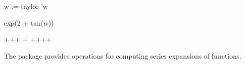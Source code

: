 {{{{{{{{{{{{{{\begin{xtc}
\begin{spadsrc}
w := taylor 'w 
\end{spadsrc}
\begin{TeXOutput}
\begin{fricasmath}{11}
%
\end{fricasmath}
\end{TeXOutput}
\end{xtc}
\begin{xtc}
\begin{xtccomment}
\end{xtccomment}
\begin{spadsrc}
exp(2 + tan(w)) 
\end{spadsrc}
\begin{TeXOutput}
\begin{fricasmath}{12}
+\TIMES {}+\TIMES {}+%
\TIMES {}+\TIMES %
+\TIMES {}+\TIMES {}+\TIMES {}+%
%
\end{fricasmath}
\end{TeXOutput}
\end{xtc}


The  package provides
operations for computing series expansions of functions.

}}}}}}}}}}}}}}
